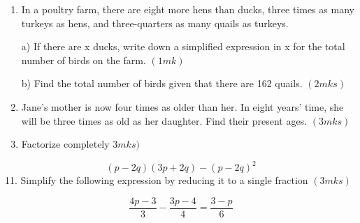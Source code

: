 \documentclass[
  a4paperpaper,
]{scrbook}
\begin{document}
\begin{tcolorbox}
\begin{enumerate}
\def\labelenumi{\arabic{enumi}.}
\setcounter{enumi}{7}
\item
  In a poultry farm, there are eight more hens than ducks, three times
  as many turkeys as hens, and three-quarters as many quails as turkeys.

  a) If there are x ducks, write down a simplified expression in x for
  the total number of birds on the farm. \((1mk)\)

  b) Find the total number of birds given that there are 162 quails.
  \((2mks)\)
\item
  Jane's mother is now four times as older than her. In eight years'
  time, she will be three times as old as her daughter. Find their
  present ages. \((3mks)\)
\item
  Factorize completely \(3mks)\)
\end{enumerate}

\[
(p-2q)(3p+2q)-(p-2q)^2
\] 11. Simplify the following expression by reducing it to a single
fraction \((3 mks)\)

\[
\frac{4p-3}{3}-\frac{3p-4}{4}=\frac{3-p}{6}
\]


\end{tcolorbox}
\end{document}

